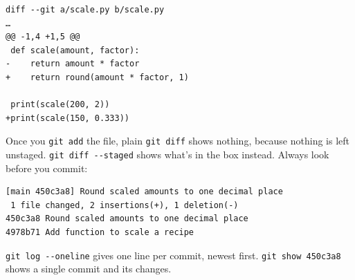\begin{codeblock}

\begin{Shaded}
\begin{Highlighting}[]
\end{Highlighting}
\end{Shaded}

\end{codeblock}

\begin{codeblock}
\begin{Verbatim}[formatcom=\outputstyle]
diff --git a/scale.py b/scale.py
…
@@ -1,4 +1,5 @@
 def scale(amount, factor):
-    return amount * factor
+    return round(amount * factor, 1)
 
 print(scale(200, 2))
+print(scale(150, 0.333))
\end{Verbatim}
\end{codeblock}


Once you \texttt{git\ add} the file, plain \texttt{git\ diff} shows nothing, because nothing is left unstaged. \texttt{git\ diff\ -\/-staged} shows what's in the box instead. Always look before you commit:

\begin{codeblock}

\begin{Shaded}
\begin{Highlighting}[]
 
\end{Highlighting}
\end{Shaded}

\end{codeblock}

\begin{codeblock}
\begin{Verbatim}[formatcom=\outputstyle]
[main 450c3a8] Round scaled amounts to one decimal place
 1 file changed, 2 insertions(+), 1 deletion(-)
450c3a8 Round scaled amounts to one decimal place
4978b71 Add function to scale a recipe
\end{Verbatim}
\end{codeblock}

\texttt{git\ log\ -\/-oneline} gives one line per commit, newest first. \texttt{git\ show\ 450c3a8} shows a single commit and its changes.

